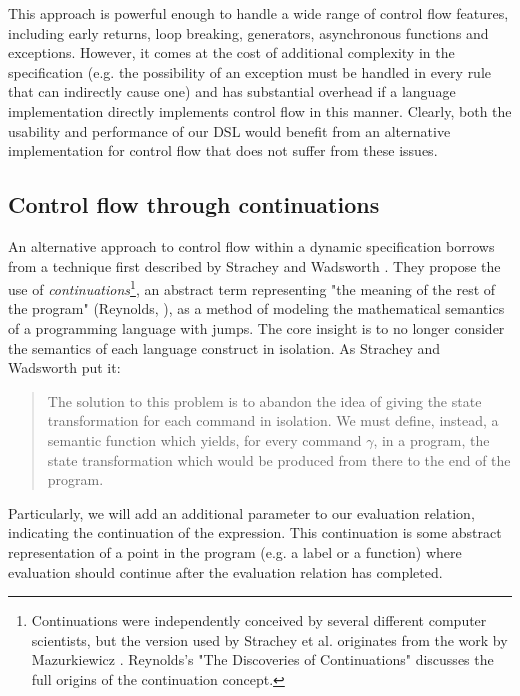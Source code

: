 This approach is powerful enough to handle a wide range of control flow features, including early returns, loop breaking, generators, asynchronous functions and exceptions. However, it comes at the cost of additional complexity in the specification (e.g. the possibility of an exception must be handled in every rule that can indirectly cause one) and has substantial overhead if a language implementation directly implements control flow in this manner. Clearly, both the usability and performance of our \ac{DSL} would benefit from an alternative implementation for control flow that does not suffer from these issues.

\subsection{Control flow through continuations}
An alternative approach to control flow within a dynamic specification borrows from a technique first described by Strachey and Wadsworth \cite{continuations_mathematical_semantics}. They propose the use of \textit{continuations}\footnote{Continuations were independently conceived by several different computer scientists, but the version used by Strachey et al. originates from the work by Mazurkiewicz \cite{Mazurkiewicz71}. Reynolds's "The Discoveries of Continuations" \cite{Reynolds93} discusses the full origins of the continuation concept.}, an abstract term representing "the meaning of the rest of the program" (Reynolds,  \cite{Reynolds93}), as a method of modeling the mathematical semantics of a programming language with jumps. The core insight is to no longer consider the semantics of each language construct in isolation. As Strachey and Wadsworth put it:

\begin{quote}
The solution to this problem is to abandon the idea of giving the state transformation for each command in isolation. We must define, instead, a semantic function which yields, for every command $\gamma$, in a program, the state transformation which would be produced from there to the end of the program.
\end{quote}

Particularly, we will add an additional parameter to our evaluation relation, indicating the continuation of the expression. This continuation is some abstract representation of a point in the program (e.g. a label or a function) where evaluation should continue after the evaluation relation has completed.\\

